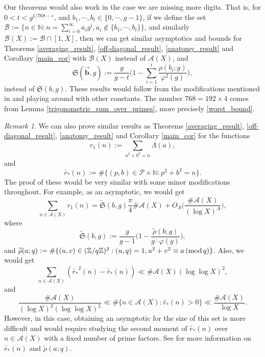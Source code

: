 \documentclass[12pt]{amsart}
\theoremstyle{definition}
\theoremstyle{definition}
\theoremstyle{remark}
\newtheorem{remark}[thm]{Remark}
\numberwithin{equation}{section}
\newcommand{\N}{\mathbb{N}}
\newcommand{\Z}{\mathbb{Z}}
\newcommand{\CA}{\mathcal{A}}
\newcommand{\CB}{\mathcal{B}}
\newcommand{\CP}{\mathcal{P}}
\renewcommand{\tilde}{\widetilde}
\renewcommand{\mod}[1]{\,({\rm mod}\,#1)}
\newcommand{\vect}[1]{\overrightarrow{\boldsymbol{#1}}}
\begin{document}
Our theorems would also work in the case we are missing more digits. That is, for $0< t <g^{1/768 - \varepsilon}$, and $b_1,\cdots , b_t\in \{0,\cdots , g-1\}$, if we define the set $\CB:= \{n\in \N : n=\sum_{i=0}^{\infty} a_i g^i, a_i\not\in \{b_1,\cdots , b_t\} \}$, and similarly $\CB(X):=\CB \cap [1,X]$, then we can get similar asymptotics and bounds for Theorems \ref{averaging_result}, \ref{off-diagonal_result}, \ref{anatomy_result} and Corollary \ref{main_cor} with $\CB(X)$ instead of $\CA(X)$, and
$$ \mathfrak{S}(\vect{b},g) := \frac{g}{g-t} \bigg( 1  - \sum_{i=1}^t \frac{\rho(b_i ; g)}{\varphi^2(g)} \bigg), $$
instead of $\mathfrak{S}(b,g)$. These results would follow from the modifications mentioned in \cite{MR4452438} and playing around with other constants. The number $768=192\times 4$ comes from Lemma \ref{trigonometric_sum_over_primes}, more precisely \eqref{worst_bound}.

\begin{remark}
We can also prove similar results as Theorems \ref{averaging_result}, \ref{off-diagonal_result}, \ref{anatomy_result} and Corollary \ref{main_cor} for the functions
$$ r_1(n) := \sum_{a^2+b^2=n} \Lambda(a) ,$$
and
$$ \tilde{r_{*}}(n) := \#\{ (p,b)\in \CP\times \N : p^2+b^2=n \}. $$
The proof of these would be very similar with some minor modifications throughout. For example, as an asymptotic, we would get
$$ \sum_{n\in \CA(X)} r_1(n) = \tilde{\mathfrak{S}}(b,g) \frac{\pi}{4} \#\CA(X) + O_A\bigg( \frac{\#\CA(X)}{(\log X)^A} \bigg) , $$
where
$$  \tilde{\mathfrak{S}}(b,g) := \frac{g}{g-1} \bigg( 1  - \frac{\tilde{\rho}(b;g)}{g\cdot \varphi(g)}\bigg), $$
and $\tilde{\rho}(a;q):=\#\{(u,v)\in (\Z/q\Z)^2 : (u,q)=1 , u^2+v^2\equiv a \mod q \}$. Also, we would get
$$ \sum_{n\in \CA(X)} (\tilde{r_{*}}^2(n) - \tilde{r_{*}}(n)) \ll \#\CA(X) (\log\log X)^2 , $$
and
$$ \frac{\#\CA(X)}{(\log X)^2 (\log\log X)^2} \ll \#\{n\in \CA(X) : \tilde{r_{*}}(n) >0\} \ll \frac{\#\CA(X)}{\log X}. $$
However, in this case, obtaining an asymptotic for the size of this set is more difficult and would require studying the second moment of $\tilde{r_{*}}(n)$ over $n\in \CA(X)$ with a fixed number of prime factors. See \cite{MR1833070, MR4772301} for more information on $\tilde{r_{*}}(n)$ and $\tilde{\rho}(a;q)$.
\end{remark}
\end{document}
